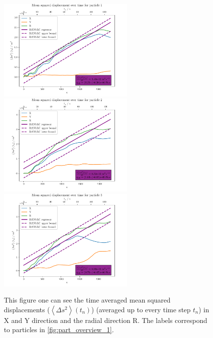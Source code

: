 \documentclass[12pt,english]{scrartcl}
\begin{document}
\begin{figure}[H]
	\centering
	\includegraphics[width=0.6\textwidth]{figures/I1_particle_1.pdf}
	\includegraphics[width=0.6\textwidth]{figures/I1_particle_2.pdf}
	\includegraphics[width=0.6\textwidth]{figures/I1_particle_3.pdf}
	\caption[Time averaged mean squared displacements from the particles of the first
		capture]{This figure one can see the time averaged mean squared displacements
		($\left\langle \Delta s^2 \right\rangle(t_n)$) (averaged up to every time step
		$t_n$) in X and Y direction and the radial direction R. The labels correspond
		to particles in \autoref{fig:part_overview_1}.
	}\label{fig:part_first}
\end{figure}
\end{document}
